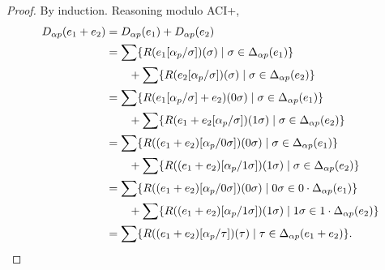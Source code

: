 \documentclass{article}
\newcommand\pdup{\mathop{\mathsf{dup}}}
\newcommand\repname{R}
\newcommand\rep[2]{\repname(#2)(#1)}
\newcommand\STD{\Delta}
\begin{document}
\begin{proof}
By induction. Reasoning modulo ACI+,
\begin{align*}
D_{\alpha p}(e_1+e_2) &= D_{\alpha p}(e_1) + D_{\alpha p}(e_2)\\
&= \sum\set{\rep\sigma{e_1\subst{\alpha_p}\sigma}}{\sigma\in\STD_{\alpha p}(e_1)}\\
& \qquad + \sum\set{\rep\sigma{e_2\subst{\alpha_p}\sigma}}{\sigma\in\STD_{\alpha p}(e_2)}\\
&= \sum\set{\rep{0\sigma}{e_1\subst{\alpha_p}\sigma+e_2}}{\sigma\in\STD_{\alpha p}(e_1)}\\
& \qquad + \sum\set{\rep{1\sigma}{e_1+e_2\subst{\alpha_p}\sigma}}{\sigma\in\STD_{\alpha p}(e_2)}\\
&= \sum\set{\rep{0\sigma}{(e_1+e_2)\subst{\alpha_p}{0\sigma}}}{\sigma\in\STD_{\alpha p}(e_1)}\\
& \qquad + \sum\set{\rep{1\sigma}{(e_1+e_2)\subst{\alpha_p}{1\sigma}}}{\sigma\in\STD_{\alpha p}(e_2)}\\
&= \sum\set{\rep{0\sigma}{(e_1+e_2)\subst{\alpha_p}{0\sigma}}}{0\sigma\in 0\cdot\STD_{\alpha p}(e_1)}\\
& \qquad + \sum\set{\rep{1\sigma}{(e_1+e_2)\subst{\alpha_p}{1\sigma}}}{1\sigma\in 1\cdot\STD_{\alpha p}(e_2)}\\
&= \sum\set{\rep{\tau}{(e_1+e_2)\subst{\alpha_p}{\tau}}}{\tau\in\STD_{\alpha p}(e_1+e_2)}.
\end{align*}

\end{proof}
\end{document}
